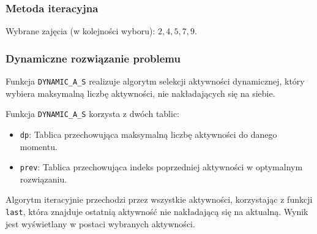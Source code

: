 \documentclass{article}
\begin{document}
	\subsubsection*{Metoda iteracyjna}
	Wybrane zajęcia (w kolejności wyboru): \(2, 4, 5, 7, 9\).

	\subsubsection*{Dynamiczne rozwiązanie problemu}
	Funkcja \texttt{DYNAMIC\_A\_S} realizuje algorytm selekcji aktywności dynamicznej, który wybiera maksymalną liczbę aktywności, nie nakładających się na siebie. 

	Funkcja \texttt{DYNAMIC\_A\_S} korzysta z dwóch tablic:
	\begin{itemize}
		\item \texttt{dp}: Tablica przechowująca maksymalną liczbę aktywności do danego momentu.
		\item \texttt{prev}: Tablica przechowująca indeks poprzedniej aktywności w optymalnym rozwiązaniu.
	\end{itemize}
	Algorytm iteracyjnie przechodzi przez wszystkie aktywności, korzystając z funkcji \texttt{last}, która znajduje ostatnią aktywność nie nakładającą się na aktualną. Wynik jest wyświetlany w postaci wybranych aktywności.
	
\end{document}

